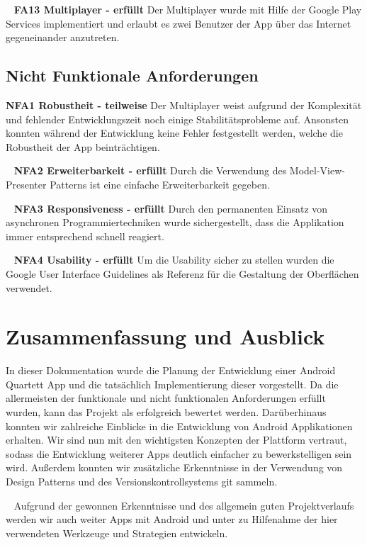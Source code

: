 \documentclass{scrartcl}
\begin{document}
\ \newline
\textbf{FA13 Multiplayer - erfüllt} \newline
Der Multiplayer wurde mit Hilfe der Google Play Services implementiert und
erlaubt es zwei Benutzer der App über das Internet gegeneinander anzutreten.

\subsection{Nicht Funktionale Anforderungen}

\textbf{NFA1 Robustheit - teilweise} \newline
Der Multiplayer weist aufgrund der Komplexität und fehlender Entwicklungszeit
noch einige Stabilitätsprobleme auf. Ansonsten konnten während der Entwicklung
keine Fehler festgestellt werden, welche die Robustheit der App beinträchtigen.

\ \newline
\textbf{NFA2 Erweiterbarkeit - erfüllt} \newline
Durch die Verwendung des Model-View-Presenter Patterns ist eine einfache
Erweiterbarkeit gegeben.

\ \newline
\textbf{NFA3 Responsiveness - erfüllt} \newline
Durch den permanenten Einsatz von asynchronen Programmiertechniken wurde
sichergestellt, dass die Applikation immer entsprechend schnell reagiert.

\ \newline
\textbf{NFA4 Usability - erfüllt} \newline
Um die Usability sicher zu stellen wurden die Google User Interface Guidelines
als Referenz für die Gestaltung der Oberflächen verwendet.

\section{Zusammenfassung und Ausblick}

In dieser Dokumentation wurde die Planung der Entwicklung einer Android Quartett
App und die tatsächlich Implementierung dieser vorgestellt. Da die allermeisten
der funktionale und nicht funktionalen Anforderungen erfüllt wurden, kann das
Projekt als erfolgreich bewertet werden. Darüberhinaus konnten wir zahlreiche
Einblicke in die Entwicklung von Android Applikationen erhalten. Wir sind nun
mit den wichtigsten Konzepten der Plattform vertraut, sodass die Entwicklung
weiterer Apps deutlich einfacher zu bewerkstelligen sein wird. Außerdem konnten
wir zusätzliche Erkenntnisse in der Verwendung von Design Patterns und des
Versionskontrollsystems git sammeln.

\ \newline
Aufgrund der gewonnen Erkenntnisse und des allgemein guten Projektverlaufs werden
wir auch weiter Apps mit Android und unter zu Hilfenahme der hier verwendeten
Werkzeuge und Strategien entwickeln.
\end{document}
